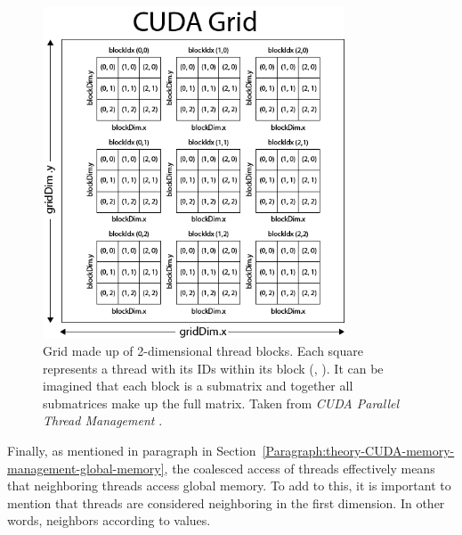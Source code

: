 \begin{figure}[ht!]
	\centering
	\includegraphics[width=0.8\textwidth, keepaspectratio]{images/ch1/CUDA-GridBlockThread-Structure.png}
	\caption{Grid made up of 2-dimensional thread blocks. Each square represents a thread with its IDs within its block (, ). It can be imagined that each block is a submatrix and together all submatrices make up the full matrix. Taken from \emph{CUDA Parallel Thread Management} \cite{McKennon13June2013}.}
	\label{Figure:theory-CUDA-GridBlockThread-Structure}
\end{figure}

Finally, as mentioned in paragraph \textit{} in Section~\ref{Paragraph:theory-CUDA-memory-management-global-memory}, the coalesced access of threads effectively means that neighboring threads access global memory. To add to this, it is important to mention that threads are considered neighboring in the first dimension. In other words, neighbors according to  values.

